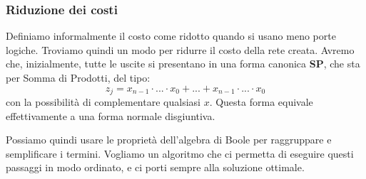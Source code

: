 \documentclass[a4paper,11pt]{article}
\begin{document}
\subsubsection{Riduzione dei costi}
Definiamo informalmente il costo come ridotto quando si usano meno porte logiche.
Troviamo quindi un modo per ridurre il costo della rete creata.
Avremo che, inizialmente, tutte le uscite si presentano in una forma canonica \textbf{SP}, che sta per Somma di Prodotti, del tipo:
$$ 
z_j = x_{n-1} \cdot ... \cdot x_0 + ... + x_{n-1} \cdot ... \cdot x_0
$$
con la possibilità di complementare qualsiasi $x$. 
Questa forma equivale effettivamente a una forma normale disgiuntiva.

Possiamo quindi usare le proprietà dell'algebra di Boole per raggruppare e semplificare i termini.
Vogliamo un algoritmo che ci permetta di eseguire questi passaggi in modo ordinato, e ci porti sempre alla soluzione ottimale.
\end{document}
